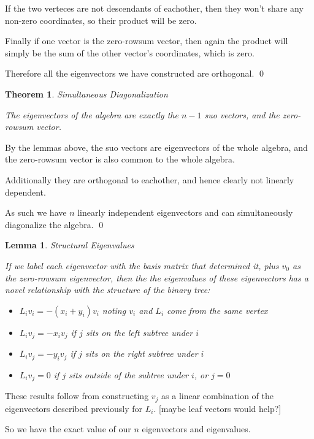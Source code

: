 \documentclass[10pt,a4paper]{report}
\newtheorem{theorem}{Theorem}
\newtheorem{lemma}{Lemma}
\begin{document}
If the two verteces are not descendants of eachother, then they won't share any
non-zero coordinates, so their product will be zero.

Finally if one vector is the zero-rowsum vector, then again the product will
simply be the sum of the other vector's coordinates, which is zero.

Therefore all the eigenvectors we have constructed are orthogonal. \qed

\begin{theorem} Simultaneous Diagonalization

	The eigenvectors of the algebra are exactly the $n-1$ suo vectors, and the
	zero-rowsum vector.
\end{theorem}

By the lemmas above, the suo vectors are eigenvectors of the whole algebra, and
the zero-rowsum vector is also common to the whole algebra.

Additionally they are orthogonal to eachother, and hence clearly not linearly
dependent.

As such we have $n$ linearly independent eigenvectors and can simultaneously
diagonalize the algebra. \qed

\begin{lemma} Structural Eigenvalues

	If we label each eigenvector with the basis matrix that determined it, plus
	$v_0$ as the zero-rowsum eigenvector, then the the eigenvalues of these
	eigenvectors has a novel relationship with the structure of the binary
	tree:
	\begin{itemize}
		\item ${L_i}{v_i} = -(x_i + y_i)v_i$ noting $v_i$ and $L_i$ come from
			the same vertex
		\item ${L_i}{v_j} = -{x_i}{v_j}$ if $j$ sits on the left subtree under
			$i$
		\item ${L_i}{v_j} = -{y_i}{v_j}$ if $j$ sits on the right subtree under
			$i$
		\item ${L_i}{v_j} = 0$ if $j$ sits outside of the subtree under $i$, or
			$j=0$
	\end{itemize}
\end{lemma}

These results follow from constructing $v_j$ as a linear combination of the
eigenvectors described previously for $L_i$. [maybe leaf vectors would help?]

So we have the exact value of our $n$ eigenvectors and eigenvalues.
\end{document}
